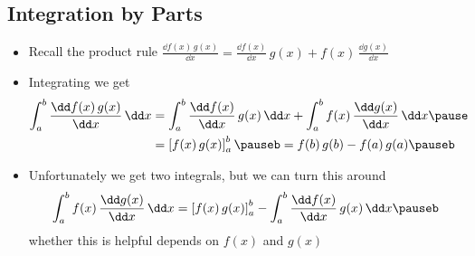 
\begin{slide}
\section{Integration by Parts}

\begin{PauseHighLight}
  \begin{itemize}
  \item Recall the product rule $\frac{\dd f(x)\, g(x)}{\dd x} =
    \frac{\dd f(x)}{\dd x}\,{\scriptstyle g(x) + f(x)}\, \frac{\dd g(x)}{\dd x}$\pause
  \item Integrating we get
    \begin{align*}
      \int_a^b \frac{\dd f(x)\, g(x)}{\dd x} \, \dd x
      &= \int_a^b  \frac{\dd f(x)}{\dd x}\, g(x) \, \dd x 
        + \int_a^b  f(x)\, \frac{\dd g(x)}{\dd x}\, \dd x \pause\\
        &= \left[ f(x)\, g(x)\right]_a^b \pauseb = f(b)\,g(b) - f(a)\,g(a)\pauseb
    \end{align*}
  \item Unfortunately we get two integrals\pause, but we can turn this around
    \begin{align*}
      \int_a^b  f(x)\, \frac{\dd g(x)}{\dd x}\, \dd x  = \left[ f(x)\,
      g(x)\right]_a^b  - \int_a^b  \frac{\dd f(x)}{\dd x}\, g(x) \, \dd x \pauseb
    \end{align*}
    whether this is helpful depends on $f(x)$ and $g(x)$\pauseb
  \end{itemize}
\end{PauseHighLight}

\end{slide}


